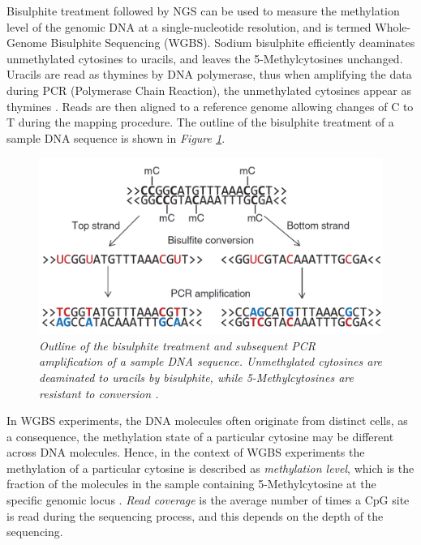 Bisulphite treatment \citep{Frommer1992} followed by NGS can be used to measure the methylation level of the genomic DNA at a single-nucleotide resolution, and is termed Whole-Genome Bisulphite Sequencing (WGBS). Sodium bisulphite efficiently deaminates unmethylated cytosines to uracils, and leaves the 5-Methylcytosines unchanged. Uracils are read as thymines by DNA polymerase, thus when amplifying the data during PCR (Polymerase Chain Reaction), the unmethylated cytosines appear as thymines \citep{Krueger2012}. Reads are then aligned to a reference genome allowing changes of C to T during the mapping procedure. 
The outline of the bisulphite treatment of a sample DNA sequence is shown in \emph{Figure \ref{bisulphite-pic}}.
\begin{figure}[!ht]
	\begin{center}
 		\includegraphics[scale = 0.43]{images/bis-treatment.png}
		\caption{\emph{Outline of the bisulphite treatment and subsequent PCR amplification of a sample DNA sequence. Unmethylated cytosines are deaminated to uracils by bisulphite, while 5-Methylcytosines are resistant to conversion \citep{Krueger2012}.}}
		\label{bisulphite-pic}
	\end{center}
\end{figure} 

In WGBS experiments, the DNA molecules often originate from distinct cells, as a consequence, the methylation state of a particular cytosine may be different across DNA molecules. Hence, in the context of WGBS experiments the methylation of a particular cytosine is described as \emph{methylation level}, which is the fraction of the molecules in the sample containing 5-Methylcytosine at the specific genomic locus \citep{Schultz2012}. \emph{Read coverage} is the average number of times a CpG site is read during the sequencing process, and this depends on the depth of the sequencing.

